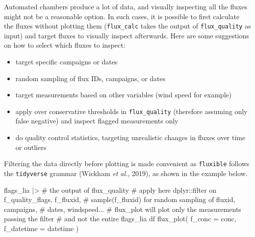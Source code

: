 \documentclass[
  letterpaper,
  DIV=11,
  numbers=noendperiod]{scrartcl}
\newenvironment{Shaded}{\begin{snugshade}}{\end{snugshade}}
\newcommand{\AttributeTok}[1]{\textcolor[rgb]{0.40,0.45,0.13}{#1}}
\newcommand{\CommentTok}[1]{\textcolor[rgb]{0.37,0.37,0.37}{#1}}
\newcommand{\FunctionTok}[1]{\textcolor[rgb]{0.28,0.35,0.67}{#1}}
\newcommand{\NormalTok}[1]{\textcolor[rgb]{0.00,0.23,0.31}{#1}}
\newcommand{\SpecialCharTok}[1]{\textcolor[rgb]{0.37,0.37,0.37}{#1}}
\providecommand{\tightlist}{%
  \setlength{\itemsep}{0pt}\setlength{\parskip}{0pt}}\usepackage{longtable,booktabs,array}
\begin{document}
\begin{tcolorbox}[enhanced jigsaw, breakable, colback=white, coltitle=black, toprule=.15mm, titlerule=0mm, rightrule=.15mm, toptitle=1mm, opacitybacktitle=0.6, colbacktitle=quarto-callout-tip-color!10!white, bottomtitle=1mm, title={Handling lots of data?}, arc=.35mm, colframe=quarto-callout-tip-color-frame, bottomrule=.15mm, leftrule=.75mm, left=2mm, opacityback=0]

Automated chambers produce a lot of data, and visually inspecting all
the fluxes might not be a reasonable option. In such cases, it is
possible to first calculate the fluxes without plotting them
(\texttt{flux\_calc} takes the output of \texttt{flux\_quality} as
input) and target fluxes to visually inspect afterwards. Here are some
suggestions on how to select which fluxes to inspect:

\begin{itemize}
\tightlist
\item
  target specific campaigns or dates
\item
  random sampling of flux IDs, campaigns, or dates
\item
  target measurements based on other variables (wind speed for example)
\item
  apply over conservative thresholds in \texttt{flux\_quality}
  (therefore assuming only false negative) and inspect flagged
  measurements only
\item
  do quality control statistics, targeting unrealistic changes in fluxes
  over time or outliers
\end{itemize}

Filtering the data directly before plotting is made convenient as
\texttt{fluxible} follows the \texttt{tidyverse} grammar (Wickham
\emph{et al.}, 2019), as shown in the example below.

\begin{Shaded}
\begin{Highlighting}[]
\NormalTok{flags\_lia }\SpecialCharTok{|\textgreater{}} \CommentTok{\# the output of flux\_quality}
\CommentTok{\# apply here dplyr::filter on f\_quality\_flags, f\_fluxid,}
\CommentTok{\# sample(f\_fluxid) for random sampling of fluxid, campaigns,}
\CommentTok{\# dates, windspeed...}
\CommentTok{\# flux\_plot will plot only the measurements passing the filter}
\CommentTok{\# and not the entire flags\_lia df}
  \FunctionTok{flux\_plot}\NormalTok{(}
    \AttributeTok{f\_conc =}\NormalTok{ conc,}
    \AttributeTok{f\_datetime =}\NormalTok{ datetime}
\NormalTok{  )}
\end{Highlighting}
\end{Shaded}

\end{tcolorbox}
\end{document}
